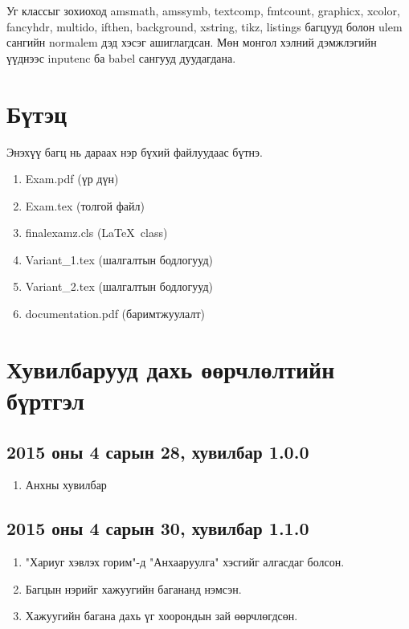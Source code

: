 \documentclass[10pt]{article}
\theoremstyle{definition}
\begin{document}
\par Уг классыг зохиоход amsmath, amssymb, textcomp, fmtcount, graphicx, xcolor, fancyhdr, multido, ifthen, background, xstring, tikz, listings багцууд болон ulem сангийн normalem дэд хэсэг ашиглагдсан. Мөн монгол хэлний дэмжлэгийн үүднээс inputenc ба babel сангууд дуудагдана.

\section{Бүтэц}

Энэхүү багц нь дараах нэр бүхий файлуудаас бүтнэ.
\begin{enumerate}
 \item Exam.pdf (үр дүн)
 \item Exam.tex (толгой файл)
 \item finalexamz.cls (\LaTeX\ class)
 \item Variant\_1.tex (шалгалтын бодлогууд)
 \item Variant\_2.tex (шалгалтын бодлогууд)
 \item documentation.pdf (баримтжуулалт)
\end{enumerate}

\section{Хувилбарууд дахь өөрчлөлтийн бүртгэл}

\subsection{2015 оны 4 сарын 28, хувилбар 1.0.0}

\begin{enumerate}
 \item Анхны хувилбар
\end{enumerate}

\subsection{2015 оны 4 сарын 30, хувилбар 1.1.0}

\begin{enumerate}
 \item "Хариуг хэвлэх горим"{}-д "Анхааруулга" хэсгийг алгасдаг болсон.
 \item Багцын нэрийг хажуугийн багананд нэмсэн.
 \item Хажуугийн багана дахь үг хоорондын зай өөрчлөгдсөн.
\end{enumerate}
\end{document}
